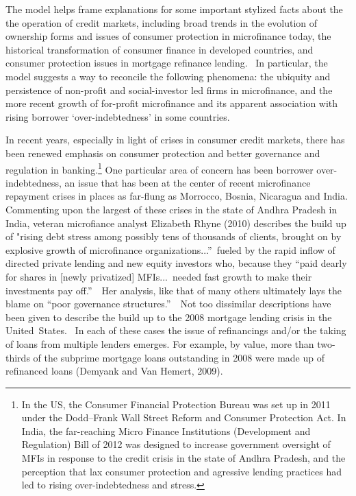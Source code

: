 \documentclass[11pt]{article}%
\begin{document}
The model helps frame explanations for some important stylized facts about the
the operation of credit markets, including broad trends in the evolution of
ownership forms and issues of consumer protection in microfinance today, the
historical transformation of consumer finance in developed countries, and
consumer protection issues in mortgage refinance lending. \ In particular, the
model suggests a way to reconcile the following phenomena: the ubiquity and
persistence of non-profit and social-investor led firms in microfinance, and
the more recent growth of for-profit microfinance and its apparent association
with rising borrower `over-indebtedness' in some countries.

In recent years, especially in light of crises in consumer credit markets,
there has been renewed emphasis on consumer protection and better governance
and regulation in banking.\footnote{%
In the US, the Consumer Financial
Protection Bureau was set up in 2011 under the Dodd--Frank Wall Street Reform
and Consumer Protection Act. In India, the far-reaching Micro Finance
Institutions (Development and Regulation) Bill of 2012 was designed to
increase government oversight of MFIs in response to the credit crisis in the
state of Andhra Pradesh, and the perception that lax consumer protection and
agressive lending practices had led to rising over-indebtedness and stress.}
One particular area of concern has been borrower over-indebtedness, an issue
that has been at the center of recent microfinance repayment crises in places
as far-flung as Morrocco, Bosnia, Nicaragua and India. Commenting upon the
largest of these crises in the state of Andhra Pradesh in India, veteran
microfiance analyst Elizabeth Rhyne (2010) describes the build up of "rising
debt stress among possibly tens of thousands of clients, brought on by
explosive growth of microfinance organizations...\textquotedblright\ fueled by
the rapid inflow of directed private lending and new equity investors who,
because they \textquotedblleft paid dearly for shares in [newly privatized]
MFIs...\ needed fast growth to make their investments pay
off.\textquotedblright\ \ Her analysis, like that of many others ultimately
lays the blame on \textquotedblleft poor governance
structures.\textquotedblright\ \ Not too dissimilar descriptions have been
given to describe the build up to the 2008 mortgage lending crisis in the
United\ States. \ In each of these cases the issue of refinancings and/or the
taking of loans from multiple lenders emerges. For example, by value, more
than two-thirds of the subprime mortgage loans outstanding in 2008 were made
up of refinanced loans (Demyank and Van Hemert, 2009).
\end{document}
